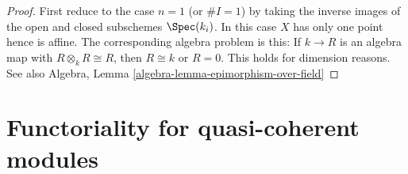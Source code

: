 \begin{proof}
First reduce to the case $n = 1$ (or $\# I = 1$)
by taking the inverse images of the
open and closed subschemes $\Spec(k_i)$.
In this case $X$ has only one point hence is affine.
The corresponding algebra problem is this:
If $k \to R$ is an algebra map
with $R \otimes_k R \cong R$, then $R \cong k$ or $R = 0$.
This holds for dimension reasons.
See also
Algebra, Lemma \ref{algebra-lemma-epimorphism-over-field}
\end{proof}










\section{Functoriality for quasi-coherent modules}
\label{section-quasi-coherent}

